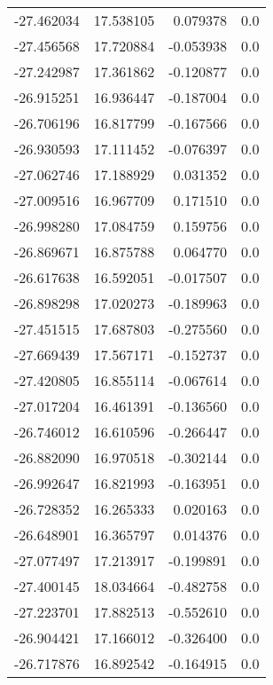 \begin{tabular}{rrrr}
      -27.462034 &        17.538105 &    0.079378 &   0.0 \\
      -27.456568 &        17.720884 &   -0.053938 &   0.0 \\
      -27.242987 &        17.361862 &   -0.120877 &   0.0 \\
      -26.915251 &        16.936447 &   -0.187004 &   0.0 \\
      -26.706196 &        16.817799 &   -0.167566 &   0.0 \\
      -26.930593 &        17.111452 &   -0.076397 &   0.0 \\
      -27.062746 &        17.188929 &    0.031352 &   0.0 \\
      -27.009516 &        16.967709 &    0.171510 &   0.0 \\
      -26.998280 &        17.084759 &    0.159756 &   0.0 \\
      -26.869671 &        16.875788 &    0.064770 &   0.0 \\
      -26.617638 &        16.592051 &   -0.017507 &   0.0 \\
      -26.898298 &        17.020273 &   -0.189963 &   0.0 \\
      -27.451515 &        17.687803 &   -0.275560 &   0.0 \\
      -27.669439 &        17.567171 &   -0.152737 &   0.0 \\
      -27.420805 &        16.855114 &   -0.067614 &   0.0 \\
      -27.017204 &        16.461391 &   -0.136560 &   0.0 \\
      -26.746012 &        16.610596 &   -0.266447 &   0.0 \\
      -26.882090 &        16.970518 &   -0.302144 &   0.0 \\
      -26.992647 &        16.821993 &   -0.163951 &   0.0 \\
      -26.728352 &        16.265333 &    0.020163 &   0.0 \\
      -26.648901 &        16.365797 &    0.014376 &   0.0 \\
      -27.077497 &        17.213917 &   -0.199891 &   0.0 \\
      -27.400145 &        18.034664 &   -0.482758 &   0.0 \\
      -27.223701 &        17.882513 &   -0.552610 &   0.0 \\
      -26.904421 &        17.166012 &   -0.326400 &   0.0 \\
      -26.717876 &        16.892542 &   -0.164915 &   0.0 \\

\end{tabular}
